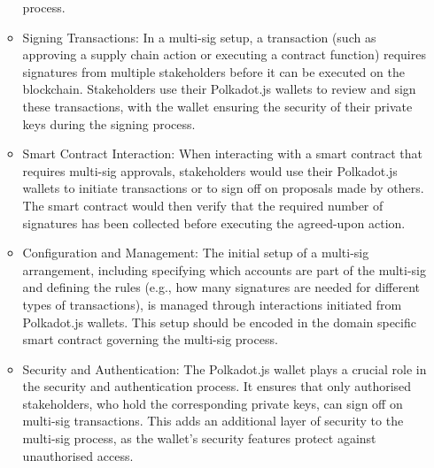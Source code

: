 \documentclass{tufte-handout}
\begin{document}
\begin{itemize}
\begin{itemize}
        process.
        \item Signing Transactions: In a multi-sig setup, a transaction (such as approving a supply chain action or executing a contract function)
        requires signatures from multiple stakeholders before it can be executed on the blockchain. Stakeholders use their Polkadot.js wallets to
        review and sign these transactions, with the wallet ensuring the security of their private keys during the signing process.
        \item Smart Contract Interaction: When interacting with a smart contract that requires multi-sig approvals, stakeholders would use their
        Polkadot.js wallets to initiate transactions or to sign off on proposals made by others. The smart contract would then verify that the required
        number of signatures has been collected before executing the agreed-upon action.
        \item Configuration and Management: The initial setup of a multi-sig arrangement, including specifying which accounts are part of the multi-sig and
        defining the rules (e.g., how many signatures are needed for different types of transactions), is managed through interactions initiated
        from Polkadot.js wallets. This setup should be encoded in the domain specific smart contract governing the multi-sig process.
        \item Security and Authentication: The Polkadot.js wallet plays a crucial role in the security and authentication process. It ensures that
        only authorised stakeholders, who hold the corresponding private keys, can sign off on multi-sig transactions. This adds an additional layer
        of security to the multi-sig process, as the wallet's security features protect against unauthorised access.
    \end{itemize}
\end{itemize}
\end{document}
